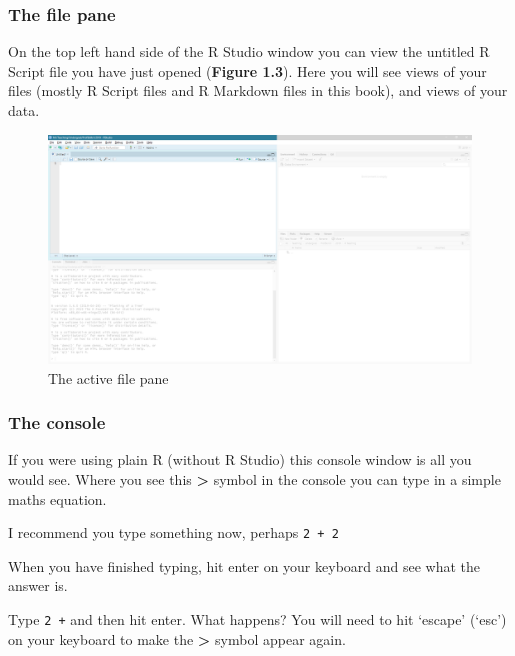 \documentclass[
]{book}
\begin{document}
\hypertarget{the-file-pane}{%
\subsubsection{The file pane}\label{the-file-pane}}

On the top left hand side of the R Studio window you can view the untitled R Script file you have just opened (\textbf{Figure 1.3}). Here you will see views of your files (mostly R Script files and R Markdown files in this book), and views of your data.

\begin{figure}

{\centering \includegraphics{images/02_install/rstud03} 

}

\caption{The active file pane}\label{fig:unnamed-chunk-8}
\end{figure}

\hypertarget{the-console}{%
\subsubsection{The console}\label{the-console}}

If you were using plain R (without R Studio) this console window is all you would see. Where you see this \textbf{\textgreater{}} symbol in the console you can type in a simple maths equation.

I recommend you type something now, perhaps \texttt{2\ +\ 2}

When you have finished typing, hit enter on your keyboard and see what the answer is.

Type \texttt{2\ +} and then hit enter. What happens? You will need to hit `escape' (`esc') on your keyboard to make the \textbf{\textgreater{}} symbol appear again.
\end{document}
